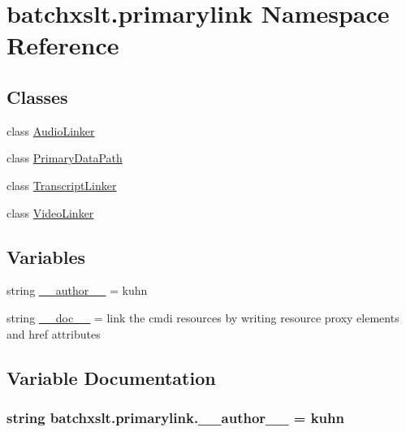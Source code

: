 \hypertarget{namespacebatchxslt_1_1primarylink}{}\section{batchxslt.\+primarylink Namespace Reference}
\label{namespacebatchxslt_1_1primarylink}
\subsection*{Classes}
\begin{DoxyCompactItemize}
\item 
class \hyperlink{classbatchxslt_1_1primarylink_1_1_audio_linker}{Audio\+Linker}
\item 
class \hyperlink{classbatchxslt_1_1primarylink_1_1_primary_data_path}{Primary\+Data\+Path}
\item 
class \hyperlink{classbatchxslt_1_1primarylink_1_1_transcript_linker}{Transcript\+Linker}
\item 
class \hyperlink{classbatchxslt_1_1primarylink_1_1_video_linker}{Video\+Linker}
\end{DoxyCompactItemize}
\subsection*{Variables}
\begin{DoxyCompactItemize}
\item 
string \hyperlink{namespacebatchxslt_1_1primarylink_a6163af58aebcbac771c49a95e544946a}{\+\_\+\+\_\+author\+\_\+\+\_\+} = \textquotesingle{}kuhn\textquotesingle{}
\item 
string \hyperlink{namespacebatchxslt_1_1primarylink_aa78a3782fe90770d3785ae6c9bcb0e91}{\+\_\+\+\_\+doc\+\_\+\+\_\+} = \textquotesingle{}link the cmdi resources by writing resource proxy elements and href attributes\textquotesingle{}
\end{DoxyCompactItemize}


\subsection{Variable Documentation}
\hypertarget{namespacebatchxslt_1_1primarylink_a6163af58aebcbac771c49a95e544946a}{}
\subsubsection[{\+\_\+\+\_\+author\+\_\+\+\_\+}]{\setlength{\rightskip}{0pt plus 5cm}string batchxslt.\+primarylink.\+\_\+\+\_\+author\+\_\+\+\_\+ = \textquotesingle{}kuhn\textquotesingle{}}\label{namespacebatchxslt_1_1primarylink_a6163af58aebcbac771c49a95e544946a}
\hypertarget{namespacebatchxslt_1_1primarylink_aa78a3782fe90770d3785ae6c9bcb0e91}{}
